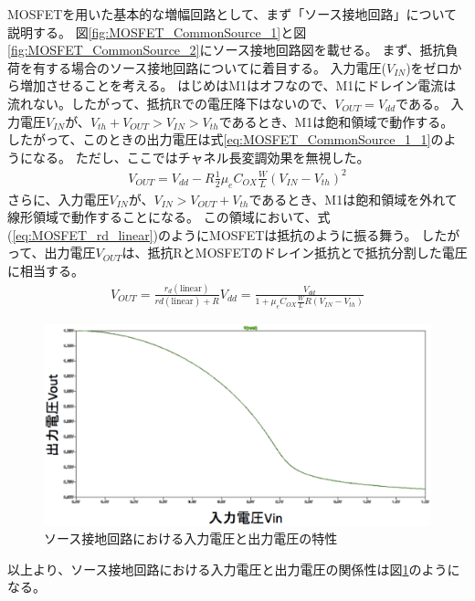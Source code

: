 			MOSFETを用いた基本的な増幅回路として、まず「ソース接地回路」について説明する。
			図\ref{fig:MOSFET_CommonSource_1}と図\ref{fig:MOSFET_CommonSource_2}にソース接地回路図を載せる。
			まず、抵抗負荷を有する場合のソース接地回路についてに着目する。
			入力電圧($V_{IN}$)をゼロから増加させることを考える。
			はじめはM1はオフなので、M1にドレイン電流は流れない。したがって、抵抗Rでの電圧降下はないので、$V_{OUT}=V_{dd}$である。
			入力電圧$V_{IN}$が、$V_{th} + V_{OUT} > V_{IN} > V_{th}$であるとき、M1は飽和領域で動作する。
			したがって、このときの出力電圧は式{\ref{eq:MOSFET_CommonSource_1_1}}のようになる。
			ただし、ここではチャネル長変調効果を無視した。
			\begin{eqnarray}
				V_{OUT} = V_{dd} - R \frac{1}{2} \mu_e C_{OX} \frac{W}{L} {(V_{IN} - V_{th})}^2
				\label{eq:MOSFET_CommonSource_1_1}
			\end{eqnarray}
			さらに、入力電圧$V_{IN}$が、$V_{IN} > V_{OUT} + V_{th}$であるとき、M1は飽和領域を外れて線形領域で動作することになる。
			この領域において、式(\ref{eq:MOSFET_rd_linear})のようにMOSFETは抵抗のように振る舞う。
			したがって、出力電圧$V_{OUT}$は、抵抗RとMOSFETのドレイン抵抗とで抵抗分割した電圧に相当する。
			\begin{eqnarray}
				V_{OUT} = \frac{r_d (\mathrm{linear})}{rd (\mathrm{linear}) + R} V_{dd} = \frac{V_{dd}}{1 + \mu_e C_{OX} \frac{W}{L} R (V_{IN} - V_{th})}
			\end{eqnarray}
			\begin{figure}[htbp]
				\begin{center}
					\includegraphics[width=12.0cm]{./Chapter/Chapter3/Picture/MOSFET_CommonSource_InOut.eps}
					\caption{ソース接地回路における入力電圧と出力電圧の特性}
					\label{fig:MOSFET_CommonSource_InOut}
				\end{center}
			\end{figure}
			以上より、ソース接地回路における入力電圧と出力電圧の関係性は図\ref{fig:MOSFET_CommonSource_InOut}のようになる。
			
